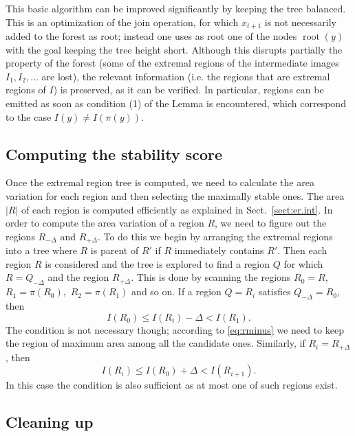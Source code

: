 \documentclass{article}
\newcommand{\rt}{\operatorname{root}}
\begin{document}
This basic algorithm can be improved significantly by keeping the tree balanced. This is an optimization of the join operation, for which $x_{t+1}$ is not necessarily added to the forest as root; instead one uses as root one of the nodes $\rt(y)$ with the goal keeping the tree height short. Although this disrupts partially the property of the forest (some of the extremal regions of the intermediate images $I_1, I_2, \ldots$ are lost), the relevant information (i.e. the regions that are extremal regions of $I$) is preserved, as it can be verified. In particular, regions can be emitted as soon as condition (1) of the Lemma is encountered, which correspond to the case $I(y) \not= I(\pi(y))$.

\subsection{Computing the stability score}

Once the extremal region tree is computed, we need to calculate the area variation for each region and then selecting the maximally stable ones.
The area $|R|$ of each region is computed efficiently as explained in Sect.~\ref{sect:er.int}. In order to compute the area variation of a region $R$, we need to figure out the regions $R_{-\Delta}$ and $R_{+\Delta}$. 
To do this we begin by arranging the extremal regions into a tree where $R$ is parent of $R'$ if $R$ immediately contains $R'$. Then each region $R$ is considered and the tree is explored to find a region $Q$ for which $R=Q_{-\Delta}$ and the region $R_{+\Delta}$. This is done by scanning the regions $R_0=R$, $R_1=\pi(R_0),$ $R_2=\pi(R_1)$ and so on. If a region $Q=R_i$ satisfies $Q_{-\Delta}=R_0$, then
\[
   I(R_0) \leq I(R_i) - \Delta < I(R_1).
\]
The condition is not necessary though; according to \eqref{eq:rminus} we need to keep the region of maximum area among all the candidate ones.
Similarly, if $R_i=R_{+\Delta}$, then
\[
   I(R_i) \leq I(R_0) + \Delta < I(R_{i+1}).
\]
In this case the condition is also sufficient as at most one of such regions exist.

\subsection{Cleaning up}\label{sect:er.cleanup}
\end{document}
